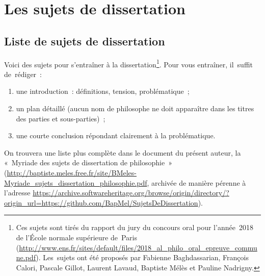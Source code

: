 \documentclass[a4paper,12pt]{report}
\begin{document}
\part{Les sujets de dissertation}
\label{sec:org522b70a}

\chapter{Liste de sujets de dissertation}
\label{sec:org3d2e8fc}
\label{orgf9e0bcb}

Voici des sujets pour s'entraîner à la dissertation\footnote{Ces sujets sont tirés du rapport du jury du concours oral pour
l'année 2018 de l'École normale supérieure de Paris
(\url{http://www.ens.fr/sites/default/files/2018\_al\_philo\_oral\_epreuve\_commune.pdf}).
Les sujets ont été proposés par Fabienne Baghdassarian, François Calori,
Pascale Gillot, Laurent Lavaud, Baptiste Mélès et Pauline Nadrigny.}. Pour vous
entraîner, il suffit de rédiger :

\begin{enumerate}
\item une introduction : définitions, tension, problématique ;

\item un plan détaillé (aucun nom de philosophe ne doit apparaître dans les
titres des parties et sous-parties) ;

\item une courte conclusion répondant clairement à la problématique.
\end{enumerate}

On trouvera une liste plus complète dans le document du présent auteur,
la « Myriade des sujets de dissertation de philosophie »
(\url{http://baptiste.meles.free.fr/site/BMeles-Myriade\_sujets\_dissertation\_philosophie.pdf},
archivée de manière pérenne à l'adresse
\url{https://archive.softwareheritage.org/browse/origin/directory/?origin\_url=https://github.com/BapMel/SujetsDeDissertation}).
\end{document}
